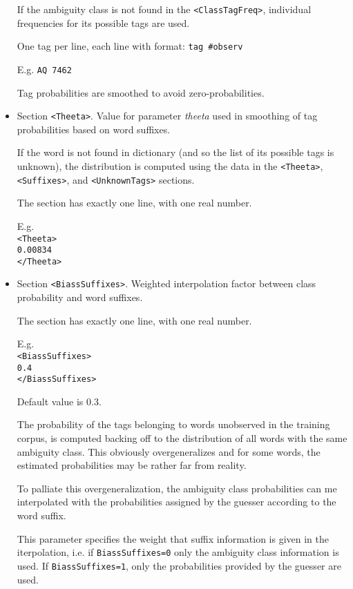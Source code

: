 \documentclass[a4paper]{book}
\begin{document}
\begin{itemize}
   If the ambiguity class is not found in the \verb#<ClassTagFreq>#, individual
   frequencies for its possible tags are used.

   One tag per line, each line with format: {\tt tag \#observ}

    E.g. {\tt AQ 7462}

   Tag probabilities are smoothed to avoid zero-probabilities.


  \item Section \verb#<Theeta>#.  Value for parameter {\it theeta}
    used in smoothing of tag probabilities based on word suffixes.

   If the word is not found in dictionary (and so the list of its
   possible tags is unknown), the distribution is computed using the
   data in the \verb#<Theeta>#, \verb#<Suffixes>#, and
   \verb#<UnknownTags># sections.

   The  section has exactly one line, with one real number.

   E.g. \\
   {\tt \verb#<Theeta>#\\
   0.00834\\
   \verb#</Theeta>#}

   \item Section \verb#<BiassSuffixes>#. Weighted interpolation factor between 
    class probability and word suffixes.
   
   The  section has exactly one line, with one real number.

   E.g. \\
   {\tt \verb#<BiassSuffixes>#\\
   0.4\\
   \verb#</BiassSuffixes>#}

   Default value is 0.3.

   The probability of the tags belonging to words unobserved in the
   training corpus, is computed backing off to the distribution of all
   words with the same ambiguity class.  This obviously
   overgeneralizes and for some words, the estimated probabilities may
   be rather far from reality.

   To palliate this overgeneralization, the ambiguity class probabilities
   can me interpolated with the probabilities assigned by the guesser 
   according to the word suffix.

   This parameter specifies the weight that suffix information is given in the iterpolation,
   i.e. if \verb#BiassSuffixes=0# only the ambiguity class information is used.
   If  \verb#BiassSuffixes=1#, only the probabilities provided by the guesser are used.


\end{itemize}
\end{document}
